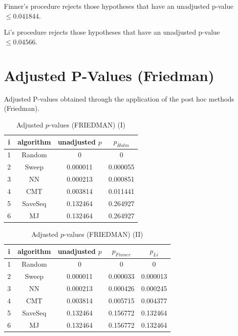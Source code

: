 \documentclass[a4paper,10pt]{article}
\begin{document}
\begin{landscape}
Finner's procedure rejects those hypotheses that have an unadjusted p-value $\le0.041844$.

Li's procedure rejects those hypotheses that have an unadjusted p-value $\le0.04566$.


\newpage

\section{Adjusted P-Values (Friedman)}


Adjusted P-values obtained through the application of the post hoc methods (Friedman).

\begin{table}[!htp]
\centering\small
\begin{tabular}{cccc}
i&algorithm&unadjusted $p$&$p_{Holm}$\\
\hline1&Random&0&0\\2&Sweep&0.000011&0.000055\\3&NN&0.000213&0.000851\\4&CMT&0.003814&0.011441\\5&SaveSeq&0.132464&0.264927\\6&MJ&0.132464&0.264927\\\hline
\end{tabular}
\caption{Adjusted $p$-values (FRIEDMAN) (I)}
\end{table}
\begin{table}[!htp]
\centering\small
\begin{tabular}{ccccc}
i&algorithm&unadjusted $p$&$p_{Finner}$&$p_{Li}$\\
\hline1&Random&0&0&0\\2&Sweep&0.000011&0.000033&0.000013\\3&NN&0.000213&0.000426&0.000245\\4&CMT&0.003814&0.005715&0.004377\\5&SaveSeq&0.132464&0.156772&0.132464\\6&MJ&0.132464&0.156772&0.132464\\\hline
\end{tabular}
\caption{Adjusted $p$-values (FRIEDMAN) (II)}
\end{table}

\newpage
\end{landscape}
\end{document}
